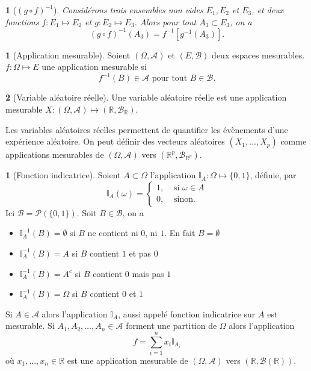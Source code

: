 \documentclass[8pt,notheorems]{beamer}
\def \R{\mathbb R}
\newtheorem{prop}{\translate{Proposition}}
\theoremstyle{definition}
\newtheorem{definition}{\translate{Definition}}
\theoremstyle{example}
\newtheorem{example}{\translate{Exemple}}
\theoremstyle{mystyle}
\theoremstyle{plain}
\begin{document}
\begin{frame}[allowframebreaks]
\begin{prop}[$(g\circ f)^{-1}$]
Considérons trois ensembles non vides $E_1,E_2$ et  $E_3$, et deux fonctions $f:E_1\mapsto E_2$ et $g:E_2\mapsto E_3$. Alors pour tout $A_3\subset E_3$, on a
$$
(g\circ f)^{-1}(A_3)=f^{-1}\left[g^{-1}(A_3)\right].
$$
\end{prop}
\begin{definition}[Application mesurable]\label{def:FnMesurable}
Soient $(\Omega,\mathcal{A})$ et $(E,\mathcal{B})$ deux espaces mesurables.  $f:\Omega\mapsto E$ une application mesurable si 
$$
f^{-1}(B)\in\mathcal{A}\text{ pour tout }B\in\mathcal{B}.
$$
\end{definition}
\begin{definition}[Variable aléatoire réelle]\label{def:FnMesurable}
Une variable aléatoire réelle est une application mesurable $X:(\Omega,\mathcal{A})\mapsto (\R,\mathcal{B}_\R)$.
\end{definition}
Les variables aléatoires réelles permettent de quantifier les évènements d'une expérience aléatoire. On peut définir des vecteurs aléatoires $(X_1,\ldots, X_p)$ comme applications mesurables de $(\Omega,\mathcal{A})$ vers $(\R^p,\mathcal{B}_{\R^p})$.
\begin{example}[Fonction indicatrice]
Soient $A\subset\Omega$ l'application $\mathbb{I}_A: \Omega\mapsto\{0,1\}$, définie,  par 
$$
\mathbb{I}_A(\omega) = \begin{cases}
1,&\text{ si }\omega\in A\\
0,&\text{ sinon.}
\end{cases}
$$
Ici $\mathcal{B} =\mathcal{P}\left(\{0,1\}\right)$. Soit $B\in \mathcal{B}$, on a 
\begin{itemize}
    \item $\mathbb{I}_A^{-1}(B) = \emptyset$ si $B$ ne contient ni $0$, ni $1$. En fait $B = \emptyset$
    \item $\mathbb{I}_A^{-1}(B) = A$ si $B$ contient $1$ et pas $0$
    \item $\mathbb{I}_A^{-1}(B) = A^c$ si $B$ contient $0$ mais pas $1$
    \item $\mathbb{I}_A^{-1}(B) = \Omega$ si $B$ contient $0$ et $1$
\end{itemize}
Si $A\in \mathcal{A}$ alors l'application $\mathbb{I}_A$, aussi appelé fonction indicatrice sur $A$ est mesurable. Si $A_1,A_2,\ldots, A_n\in\mathcal{A}$ forment une partition de $\Omega$ alors l'application 
$$
f = \sum_{i = 1}^n x_i\mathbb{I}_{A_i}
$$
où $x_1,\ldots, x_n\in\R$ est une application mesurable de $(\Omega, \mathcal{A})$ vers $(\R,\mathcal{B}(\R))$.
\end{example}
\end{frame}
\end{document}

